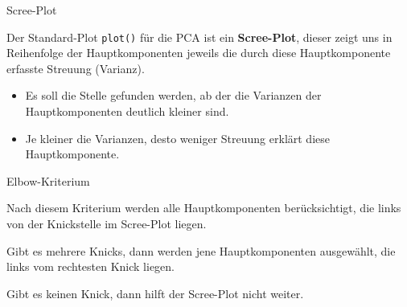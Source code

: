 \documentclass[12pt,ngerman,a4paper,ignorenonframetext,]{beamer}
\providecommand{\tightlist}{%
  \setlength{\itemsep}{0pt}\setlength{\parskip}{0pt}}
\begin{document}
\begin{frame}[fragile]{Scree-Plot}
\protect\hypertarget{scree-plot}{}

Der Standard-Plot \texttt{plot()} für die PCA ist ein
\textbf{Scree-Plot}, dieser zeigt uns in Reihenfolge der
Hauptkomponenten jeweils die durch diese Hauptkomponente erfasste
Streuung (Varianz).

\begin{itemize}
\tightlist
\item
  Es soll die Stelle gefunden werden, ab der die Varianzen der
  Hauptkomponenten deutlich kleiner sind.
\item
  Je kleiner die Varianzen, desto weniger Streuung erklärt diese
  Hauptkomponente.
\end{itemize}

\end{frame}

\begin{frame}{Elbow-Kriterium}
\protect\hypertarget{elbow-kriterium}{}

Nach diesem Kriterium werden alle Hauptkomponenten berücksichtigt, die
links von der Knickstelle im Scree-Plot liegen.

Gibt es mehrere Knicks, dann werden jene Hauptkomponenten ausgewählt,
die links vom rechtesten Knick liegen.

Gibt es keinen Knick, dann hilft der Scree-Plot nicht weiter.

\end{frame}
\end{document}
